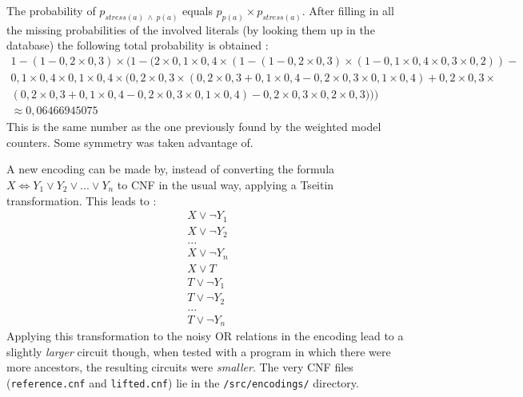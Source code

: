 The probability of $p_{stress(a)\ \land\ p(a)}$ equals $p_{p(a)}\times p_{stress(a)}$.
After filling in all the missing probabilities of the involved literals (by looking them up in the database) the following total probability is obtained :
\begin{gather*}
1-(1-0,2\times 0,3)\times (1-(2\times 0,1\times 0,4\times (1-(1-0,2\times 0,3)\times (1-0,1\times 0,4\times 0,3\times 0,2))-\\
0,1\times 0,4\times 0,1\times 0,4\times (0,2\times 0,3\times (0,2\times 0,3+0,1\times 0,4-0,2\times 0,3\times 0,1\times 0,4)+0,2\times 0,3\times\\ 
(0,2\times 0,3+0,1\times 0,4-0,2\times 0,3\times 0,1\times 0,4)-0,2\times 0,3\times 0,2\times 0,3)))\\
\approx 0,06466945075
\end{gather*}This is the same number as the one previously found by the weighted model counters. Some symmetry was taken advantage of.


A new encoding can be made by, instead of converting the formula $X\Leftrightarrow Y_1\lor Y_2 \lor ... \lor Y_n$ to CNF in the usual way, applying a Tseitin transformation. This leads to :
\begin{gather*}
X \lor \lnot Y_1\\
X \lor \lnot Y_2\\
...\\
X \lor \lnot Y_n\\
X \lor T\\
T \lor \lnot Y_1\\
T \lor \lnot Y_2\\
...\\
T \lor \lnot Y_n
\end{gather*}
Applying this transformation to the noisy OR relations in the encoding lead to a slightly \textit{larger} circuit though, when tested with a program in which there were more ancestors, the resulting circuits were \textit{smaller}. The very CNF files (\texttt{reference.cnf} and \texttt{lifted.cnf}) lie in the \texttt{/src/encodings/} directory.